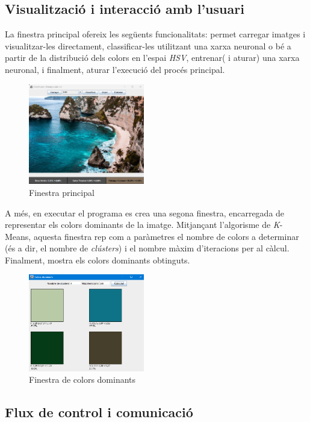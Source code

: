 \documentclass{ieeetj}
\begin{document}
\subsection{Visualització i interacció amb l'usuari}
La finestra principal ofereix les següents funcionalitats: permet carregar imatges i visualitzar-les directament, classificar-les utilitzant una xarxa neuronal o bé a partir de la distribució dels colors en l'espai \emph{HSV}, entrenar( i aturar) una xarxa neuronal, i finalment, aturar l'execució del procés principal.


\begin{figure}[H]
    \centering
    \includegraphics[width=0.45\textwidth]{png/finestra.png}
    \caption{Finestra principal}
    \label{fig:enter-label}
\end{figure}
A més, en executar el programa es crea una segona finestra, encarregada de representar els colors dominants de la imatge. Mitjançant l'algorisme de \emph{K}-Means, aquesta finestra rep com a paràmetres el nombre de colors a determinar (és a dir, el nombre de \emph{clústers}) i el nombre màxim d'iteracions per al càlcul. Finalment, mostra els colors dominants obtinguts.

\begin{figure}[H]
    \centering
    \includegraphics[width=0.45\textwidth]{png/colors.png}
    \caption{Finestra de colors dominants}
    \label{fig:enter-label}
\end{figure}

\subsection{Flux de control i comunicació}
\end{document}
